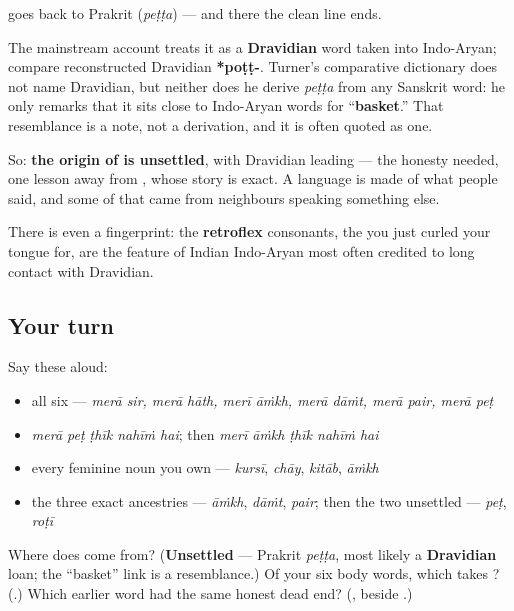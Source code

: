 \begin{cousinweb}
\textbf{} goes back to Prakrit \textbf{} (\emph{peṭṭa}) — and there the clean line ends.

The mainstream account treats it as a \textbf{Dravidian} word taken into Indo-Aryan; compare reconstructed Dravidian \textbf{*poṭṭ-}. Turner's comparative dictionary does not name Dravidian, but neither does he derive \emph{peṭṭa} from any Sanskrit word: he only remarks that it sits close to Indo-Aryan words for \textquotedblleft{}\textbf{basket}.\textquotedblright{} That resemblance is a note, not a derivation, and it is often quoted as one.

So: \textbf{the origin of  is unsettled}, with Dravidian leading — the honesty \textbf{} needed, one lesson away from \textbf{}, whose story is exact. A language is made of what people said, and some of that came from neighbours speaking something else.

There is even a fingerprint: the \textbf{retroflex} consonants, the \textbf{} you just curled your tongue for, are the feature of Indian Indo-Aryan most often credited to long contact with Dravidian.
\end{cousinweb}

\subsection*{Your turn}
Say these aloud:

\begin{itemize}
\raggedright
  \item all six — \emph{merā sir, merā hāth, merī āṁkh, merā dāṁt, merā pair, merā peṭ}
  \item \emph{merā peṭ ṭhīk nahīṁ hai}; then \emph{merī āṁkh ṭhīk nahīṁ hai}
  \item every feminine noun you own — \emph{kursī}, \emph{chāy}, \emph{kitāb}, \emph{āṁkh}
  \item the three exact ancestries — \emph{āṁkh}, \emph{dāṁt}, \emph{pair}; then the two unsettled — \emph{peṭ}, \emph{roṭī}
\end{itemize}

\begin{tcolorbox}[breakable,colback=teal!4,colframe=teal!35!black,title={Before you move on}]
Where does \textbf{} come from? (\textbf{Unsettled} — Prakrit \emph{peṭṭa}, most likely a \textbf{Dravidian} loan; the \textquotedblleft{}basket\textquotedblright{} link is a resemblance.) Of your six body words, which takes \textbf{}? (\textbf{}.) Which earlier word had the same honest dead end? (\textbf{}, beside \textbf{}.)
\end{tcolorbox}
